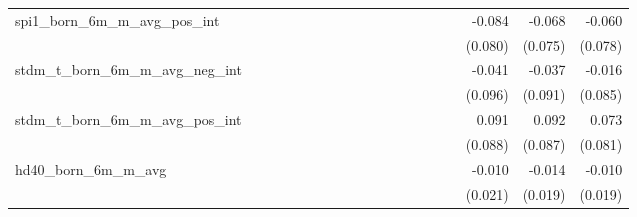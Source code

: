 \begin{tabular}{lrrrrrrrrrrrrrrrrrr}
spi1\_born\_6m\_m\_avg\_pos\_int            &             &             &             &             &             &             &             &             &             &             &             &             &             &             &             &      -0.084 &      -0.068 &      -0.060 \\ 
                                            &             &             &             &             &             &             &             &             &             &             &             &             &             &             &             &     (0.080) &     (0.075) &     (0.078) \\ 
stdm\_t\_born\_6m\_m\_avg\_neg\_int         &             &             &             &             &             &             &             &             &             &             &             &             &             &             &             &      -0.041 &      -0.037 &      -0.016 \\ 
                                            &             &             &             &             &             &             &             &             &             &             &             &             &             &             &             &     (0.096) &     (0.091) &     (0.085) \\ 
stdm\_t\_born\_6m\_m\_avg\_pos\_int         &             &             &             &             &             &             &             &             &             &             &             &             &             &             &             &       0.091 &       0.092 &       0.073 \\ 
                                            &             &             &             &             &             &             &             &             &             &             &             &             &             &             &             &     (0.088) &     (0.087) &     (0.081) \\ 
hd40\_born\_6m\_m\_avg                      &             &             &             &             &             &             &             &             &             &             &             &             &             &             &             &      -0.010 &      -0.014 &      -0.010 \\ 
                                            &             &             &             &             &             &             &             &             &             &             &             &             &             &             &             &     (0.021) &     (0.019) &     (0.019) \\ 

\end{tabular}
